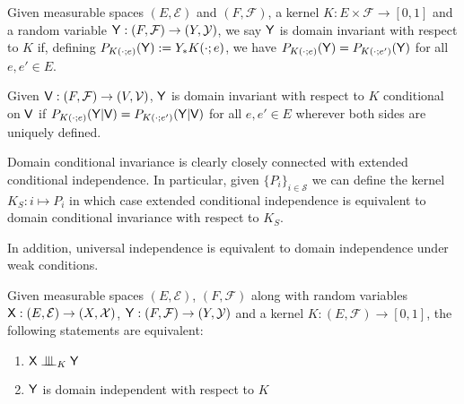 \begin{definition}\label{def:domain_indep}
Given measurable spaces $(E,\mathcal{E})$ and $(F,\mathcal{F})$, a kernel $K:E\times\mathcal{F}\to[0,1]$ and a random variable $\mathsf{Y}:( F,\mathcal{F})\to (Y,\mathcal{Y})$, we say $\mathsf{Y}$ is domain invariant with respect to $K$ if, defining $P_{K(\cdot;e)}(\mathsf{Y}):=Y_*K(\cdot;e)$, we have $P_{K(\cdot;e)}(\mathsf{Y}) = P_{K(\cdot;e')}(\mathsf{Y})$ for all $e,e'\in E$.

Given $\mathsf{V}:(F,\mathcal{F})\to (V,\mathcal{V})$, $\mathsf{Y}$ is domain invariant with respect to $K$ conditional on $\mathsf{V}$ if $P_{K(\cdot;e)}(\mathsf{Y}|\mathsf{V}) = P_{K(\cdot;e')}(\mathsf{Y}|\mathsf{V})$ for all $e,e'\in E$ wherever both sides are uniquely defined.
\end{definition}

Domain conditional invariance is clearly closely connected with extended conditional independence. In particular, given $\{P_i\}_{i\in \mathcal{S}}$ we can define the kernel $K_S:i\mapsto P_i$ in which case extended conditional independence is equivalent to domain conditional invariance with respect to $K_S$.

In addition, universal independence is equivalent to domain independence under weak conditions.

\begin{theorem}
Given measurable spaces $(E,\mathcal{E})$, $(F,\mathcal{F})$ along with random variables $\mathsf{X}:(E,\mathcal{E})\to (X,\mathcal{X})$, $\mathsf{Y}:(F,\mathcal{F})\to (Y,\mathcal{Y})$ and a kernel $K:(E,\mathcal{F})\to [0,1]$, the following statements are equivalent:
\begin{enumerate}
    \item $\RV{X}\CII_K \RV{Y}$
    \item $\mathsf{Y}$ is domain independent with respect to $K$ 
\end{enumerate}

\end{theorem}

